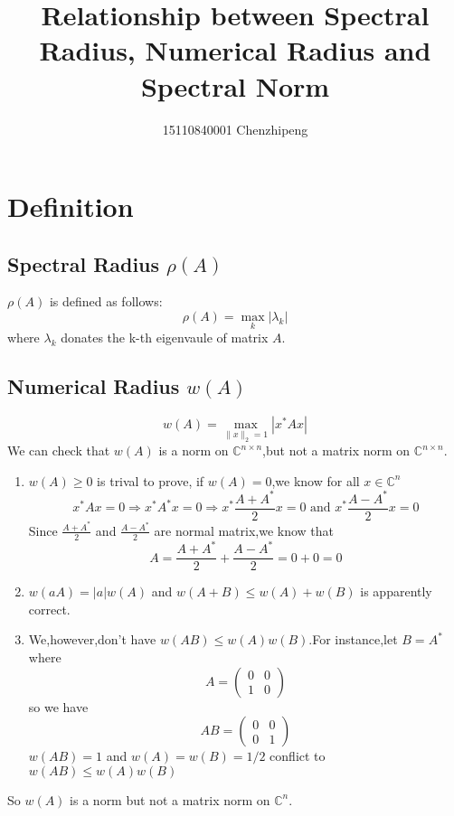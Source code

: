 \documentclass[a4paper,12pt]{article}
\author{15110840001 Chenzhipeng}
\title{Relationship between Spectral Radius, Numerical Radius and Spectral Norm}
\begin{document}
\maketitle

\section{ Definition }

\subsection{Spectral Radius $\rho(A)$}
$\rho(A)$ is defined as follows:
\[ \rho(A) = \max_k |\lambda_k|  \]
where $\lambda_k$ donates the k-th eigenvaule of matrix $A$.

\subsection{Numerical Radius $w(A)$}

\[ w(A) = \max_{\|x\|_2=1} |x^*Ax| \]
We can check that $w(A)$ is a norm on $\mathbb{C}^{n \times n}$,but not a matrix norm on $\mathbb{C}^{n \times n}$.

\begin{enumerate}
\item
$ w(A) \geq 0 $ is trival to prove, if $w(A) = 0$,we know for all $x \in \mathbb{C}^n $
\[ x^*Ax = 0 \Longrightarrow x^*A^*x = 0 \Longrightarrow x^* \frac{A + A^*}{2} x = 0 \text{ and } x^*\frac{A - A^*}{2} x = 0 \]
Since $\frac{A + A^*}{2}$ and $\frac{A - A^*}{2}$ are normal matrix,we know that 
\[ A= \frac{A + A^*}{2} + \frac{A - A^*}{2} = 0 + 0 = 0 \]
\item
$w(aA) = |a| w(A)$ and $w(A+B) \leq w(A) + w(B)$ is apparently correct.
\item
We,however,don't have $ w(AB) \leq w(A)w(B) $.For instance,let $B= A^*$ where
\[ A = \left( \begin{matrix}
0 & 0 \\
1 & 0
\end{matrix} \right)\]
so we have 
\[ AB = \left( \begin{matrix}
0 & 0 \\
0 & 1
\end{matrix} \right)\]
$w(AB) = 1$ and $w(A) = w(B) = 1/2$ conflict to $ w(AB) \leq w(A)w(B) $
\end{enumerate}

So $w(A)$ is a norm but not a matrix norm on $\mathbb{C}^n$.
\end{document}
